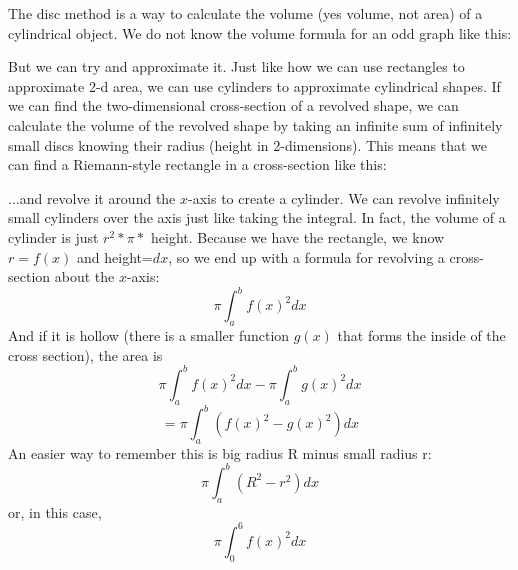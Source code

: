 \documentclass[../revisedmain.tex]{subfiles}
\begin{document}
The disc method is a way to calculate the volume (yes volume, not area) of a cylindrical object. We do not know the volume formula for an odd graph like this:
\begin{center}
\end{center}
But we can try and approximate it. Just like how we can use rectangles to approximate 2-d area, we can use cylinders to approximate cylindrical shapes. If we can find the two-dimensional cross-section of a revolved shape, we can calculate the volume of the revolved shape by taking an infinite sum of infinitely small discs knowing their radius (height in 2-dimensions). This means that we can find a Riemann-style rectangle in a cross-section like this:
\begin{center}
\end{center}
...and revolve it around the $x$-axis to create a cylinder. We can revolve infinitely small cylinders over the axis just like taking the integral. In fact, the volume of a cylinder is just $r^2 * \pi *$ height. Because we have the rectangle, we know $r=f(x)$ and height=$dx$, so we end up with a formula for revolving a cross-section about the $x$-axis:$$\pi\int_{a}^{b}f(x)^2dx$$ And if it is hollow (there is a smaller function $g(x)$ that forms the inside of the cross section), the area is $$\pi\int_{a}^{b}f(x)^2dx-\pi\int_{a}^{b}g(x)^2dx$$$$=\pi\int_{a}^{b}\left(f(x)^2-g(x)^2\right)dx$$ An easier way to remember this is big radius R minus small radius r:$$\pi\int_{a}^{b}\left(R^2-r^2\right)dx$$ or, in this case, $$\pi\int_{0}^{6}f(x)^2dx$$
\end{document}

